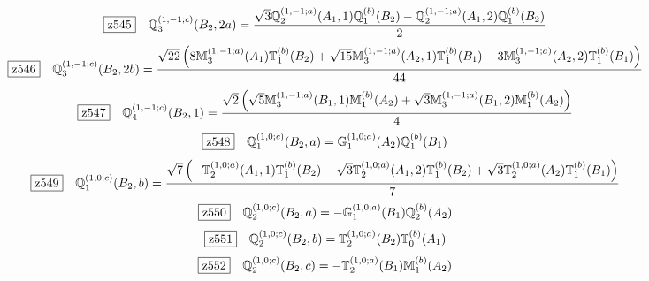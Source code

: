 \documentclass[fleqn,10pt,landscape]{jsarticle}
\begin{document}
\begin{dmath*}
\hspace*{3mm}\fbox{z545}\quad \mathbb{Q}_{3}^{(1,-1;c)}(B_{2},2a)=\frac{\sqrt{3} \mathbb{Q}_{2}^{(1,-1;a)}(A_{1},1) \mathbb{Q}_{1}^{(b)}(B_{2}) - \mathbb{Q}_{2}^{(1,-1;a)}(A_{1},2) \mathbb{Q}_{1}^{(b)}(B_{2})}{2}
\end{dmath*}
\begin{dmath*}
\hspace*{3mm}\fbox{z546}\quad \mathbb{Q}_{3}^{(1,-1;c)}(B_{2},2b)=\frac{\sqrt{22} \left(8 \mathbb{M}_{3}^{(1,-1;a)}(A_{1}) \mathbb{T}_{1}^{(b)}(B_{2}) + \sqrt{15} \mathbb{M}_{3}^{(1,-1;a)}(A_{2},1) \mathbb{T}_{1}^{(b)}(B_{1}) - 3 \mathbb{M}_{3}^{(1,-1;a)}(A_{2},2) \mathbb{T}_{1}^{(b)}(B_{1})\right)}{44}
\end{dmath*}
\begin{dmath*}
\hspace*{3mm}\fbox{z547}\quad \mathbb{Q}_{4}^{(1,-1;c)}(B_{2},1)=\frac{\sqrt{2} \left(\sqrt{5} \mathbb{M}_{3}^{(1,-1;a)}(B_{1},1) \mathbb{M}_{1}^{(b)}(A_{2}) + \sqrt{3} \mathbb{M}_{3}^{(1,-1;a)}(B_{1},2) \mathbb{M}_{1}^{(b)}(A_{2})\right)}{4}
\end{dmath*}
\begin{dmath*}
\hspace*{3mm}\fbox{z548}\quad \mathbb{Q}_{1}^{(1,0;c)}(B_{2},a)=\mathbb{G}_{1}^{(1,0;a)}(A_{2}) \mathbb{Q}_{1}^{(b)}(B_{1})
\end{dmath*}
\begin{dmath*}
\hspace*{3mm}\fbox{z549}\quad \mathbb{Q}_{1}^{(1,0;c)}(B_{2},b)=\frac{\sqrt{7} \left(- \mathbb{T}_{2}^{(1,0;a)}(A_{1},1) \mathbb{T}_{1}^{(b)}(B_{2}) - \sqrt{3} \mathbb{T}_{2}^{(1,0;a)}(A_{1},2) \mathbb{T}_{1}^{(b)}(B_{2}) + \sqrt{3} \mathbb{T}_{2}^{(1,0;a)}(A_{2}) \mathbb{T}_{1}^{(b)}(B_{1})\right)}{7}
\end{dmath*}
\begin{dmath*}
\hspace*{3mm}\fbox{z550}\quad \mathbb{Q}_{2}^{(1,0;c)}(B_{2},a)=- \mathbb{G}_{1}^{(1,0;a)}(B_{1}) \mathbb{Q}_{2}^{(b)}(A_{2})
\end{dmath*}
\begin{dmath*}
\hspace*{3mm}\fbox{z551}\quad \mathbb{Q}_{2}^{(1,0;c)}(B_{2},b)=\mathbb{T}_{2}^{(1,0;a)}(B_{2}) \mathbb{T}_{0}^{(b)}(A_{1})
\end{dmath*}
\begin{dmath*}
\hspace*{3mm}\fbox{z552}\quad \mathbb{Q}_{2}^{(1,0;c)}(B_{2},c)=- \mathbb{T}_{2}^{(1,0;a)}(B_{1}) \mathbb{M}_{1}^{(b)}(A_{2})
\end{dmath*}
\end{document}
